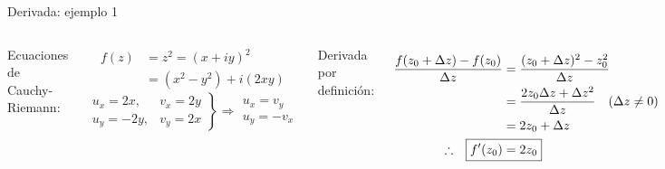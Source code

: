 \documentclass[9pt, aspectratio=169]{beamer}
\begin{document}
\begin{frame}{Derivada: ejemplo 1}
 \begin{columns}[t]
  Ecuaciones de Cauchy-Riemann:
  
  \begin{align*}
   f(z) &= z^2 = (x + i y)^2 \\
        &= (x^2 - y^2) + i (2xy)
  \end{align*}
  \[\left.{ \begin{array}{ll}
             u_x = 2 x, & v_x = 2 y \\
             u_y = -2y, & v_y = 2 x 
            \end{array}}  \right\}
            \Rightarrow \begin{array}{l}
               u_x = v_y \\
               u_y = -v_x
              \end{array}
 \]
 \pause
 
  Derivada por definición:
  
  \begin{align*}
   \frac{f(z_0 + \Delta z) - f(z_0)}{\Delta z} &= \frac{(z_0 + \Delta z)^2 - z_0^2}{\Delta z} \\
   &= \frac{2 z_0 \Delta z + \Delta z^2}{\Delta z} \quad (\Delta z \neq 0)\\
   &= 2 z_0 + \Delta z \\
   \therefore \hspace{1em} \Aboxed{ f'(z_0) &= 2 z_0 }
  \end{align*}
 \end{columns}
\end{frame}
\end{document}
